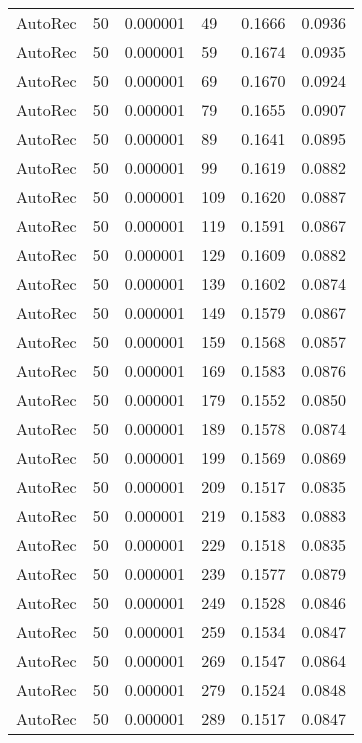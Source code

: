 \begin{tabular}{llrlrr}
 AutoRec &   50 &  0.000001 &    49 &  0.1666 &       0.0936 \\
 AutoRec &   50 &  0.000001 &    59 &  0.1674 &       0.0935 \\
 AutoRec &   50 &  0.000001 &    69 &  0.1670 &       0.0924 \\
 AutoRec &   50 &  0.000001 &    79 &  0.1655 &       0.0907 \\
 AutoRec &   50 &  0.000001 &    89 &  0.1641 &       0.0895 \\
 AutoRec &   50 &  0.000001 &    99 &  0.1619 &       0.0882 \\
 AutoRec &   50 &  0.000001 &   109 &  0.1620 &       0.0887 \\
 AutoRec &   50 &  0.000001 &   119 &  0.1591 &       0.0867 \\
 AutoRec &   50 &  0.000001 &   129 &  0.1609 &       0.0882 \\
 AutoRec &   50 &  0.000001 &   139 &  0.1602 &       0.0874 \\
 AutoRec &   50 &  0.000001 &   149 &  0.1579 &       0.0867 \\
 AutoRec &   50 &  0.000001 &   159 &  0.1568 &       0.0857 \\
 AutoRec &   50 &  0.000001 &   169 &  0.1583 &       0.0876 \\
 AutoRec &   50 &  0.000001 &   179 &  0.1552 &       0.0850 \\
 AutoRec &   50 &  0.000001 &   189 &  0.1578 &       0.0874 \\
 AutoRec &   50 &  0.000001 &   199 &  0.1569 &       0.0869 \\
 AutoRec &   50 &  0.000001 &   209 &  0.1517 &       0.0835 \\
 AutoRec &   50 &  0.000001 &   219 &  0.1583 &       0.0883 \\
 AutoRec &   50 &  0.000001 &   229 &  0.1518 &       0.0835 \\
 AutoRec &   50 &  0.000001 &   239 &  0.1577 &       0.0879 \\
 AutoRec &   50 &  0.000001 &   249 &  0.1528 &       0.0846 \\
 AutoRec &   50 &  0.000001 &   259 &  0.1534 &       0.0847 \\
 AutoRec &   50 &  0.000001 &   269 &  0.1547 &       0.0864 \\
 AutoRec &   50 &  0.000001 &   279 &  0.1524 &       0.0848 \\
 AutoRec &   50 &  0.000001 &   289 &  0.1517 &       0.0847 \\

\end{tabular}
